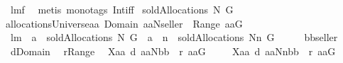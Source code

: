 \begin{isabellebody}
%
\isadelimproof
%
\endisadelimproof
%
\isatagproof
{}\isamarkupfalse%
\ lm{}{}f\ \isamarkupfalse%
\ {\isacharparenleft}metis\ {\isacharparenleft}mono{\isacharunderscore}tags{\isacharparenright}\ Int{\isacharunderscore}iff{\isacharparenright}%
\endisatagproof
{\isafoldproof}%
%
\isadelimproof
\isanewline
%
\endisadelimproof
\isanewline
{}\isamarkupfalse%
\ {\isachardoublequoteopen}soldAllocations{\isacharprime}{\isacharprime}{\isacharprime}\ N\ G\ {\isacharequal}{\isacharequal}\ \isanewline
allocationsUniverse{\isasyminter}{\isacharbraceleft}aa{\isachardot}\ Domain\ aa{\isasymsubseteq}N{\isacharminus}{\isacharbraceleft}seller{\isacharbraceright}\ {\isacharampersand}\ {\isasymUnion}Range\ aa{\isasymsubseteq}G{\isacharbraceright}{\isachardoublequoteclose}\isanewline
\isanewline
{}\isamarkupfalse%
\ lm{}{}{\isacharcolon}\ \ {\isachardoublequoteopen}a\ {\isasymin}\ soldAllocations{\isacharprime}{\isacharprime}{\isacharprime}\ N\ G{\isachardoublequoteclose}\ \ {\isachardoublequoteopen}a\ {\isacharminus}{\isacharminus}\ n\ {\isasymin}\ soldAllocations{\isacharprime}{\isacharprime}{\isacharprime}\ {\isacharparenleft}N{\isacharminus}{\isacharbraceleft}n{\isacharbraceright}{\isacharparenright}\ G{\isachardoublequoteclose}\isanewline
%
\isadelimproof
%
\endisadelimproof
%
\isatagproof
{}\isamarkupfalse%
\ {\isacharminus}\isanewline
\ \ \isamarkupfalse%
\ {\isacharquery}bb{\isacharequal}seller\ \isamarkupfalse%
\ {\isacharquery}d{\isacharequal}Domain\ \isamarkupfalse%
\ {\isacharquery}r{\isacharequal}Range\ \isamarkupfalse%
\ {\isacharquery}X{}{\isacharequal}{\isachardoublequoteopen}{\isacharbraceleft}aa{\isachardot}\ {\isacharquery}d\ aa{\isasymsubseteq}N{\isacharminus}{\isacharbraceleft}{\isacharquery}bb{\isacharbraceright}\ {\isacharampersand}\ {\isasymUnion}{\isacharquery}r\ aa{\isasymsubseteq}G{\isacharbraceright}{\isachardoublequoteclose}\ \isanewline
\ \ \isamarkupfalse%
\ {\isacharquery}X{}{\isacharequal}{\isachardoublequoteopen}{\isacharbraceleft}aa{\isachardot}\ {\isacharquery}d\ aa{\isasymsubseteq}N{\isacharminus}{\isacharbraceleft}n{\isacharbraceright}{\isacharminus}{\isacharbraceleft}{\isacharquery}bb{\isacharbraceright}\ {\isacharampersand}\ {\isasymUnion}{\isacharquery}r\ aa{\isasymsubseteq}G{\isacharbraceright}{\isachardoublequoteclose}\ \isanewline
\ \ \isamarkupfalse%

\end{isabellebody}
